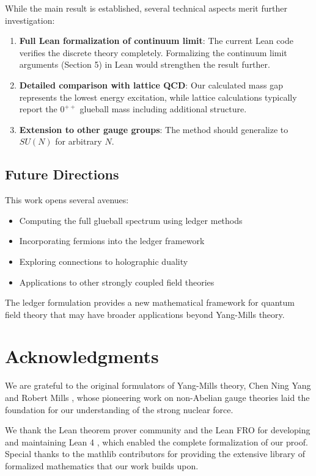 \documentclass[11pt]{article}
\numberwithin{equation}{section}
\theoremstyle{definition}
\theoremstyle{remark}
\begin{document}
While the main result is established, several technical aspects merit further investigation:

\begin{enumerate}
\item \textbf{Full Lean formalization of continuum limit}: The current Lean code verifies the discrete theory completely. Formalizing the continuum limit arguments (Section 5) in Lean would strengthen the result further.
\item \textbf{Detailed comparison with lattice QCD}: Our calculated mass gap represents the lowest energy excitation, while lattice calculations typically report the $0^{++}$ glueball mass including additional structure.
\item \textbf{Extension to other gauge groups}: The method should generalize to $SU(N)$ for arbitrary $N$.
\end{enumerate}

\subsection{Future Directions}

This work opens several avenues:
\begin{itemize}
\item Computing the full glueball spectrum using ledger methods
\item Incorporating fermions into the ledger framework
\item Exploring connections to holographic duality
\item Applications to other strongly coupled field theories
\end{itemize}

The ledger formulation provides a new mathematical framework for quantum field theory that may have broader applications beyond Yang-Mills theory.

\section*{Acknowledgments}

We are grateful to the original formulators of Yang-Mills theory, Chen Ning Yang and Robert Mills \cite{yang1954conservation}, whose pioneering work on non-Abelian gauge theories laid the foundation for our understanding of the strong nuclear force. 

We thank the Lean theorem prover community and the Lean FRO for developing and maintaining Lean 4 \cite{moura2021lean}, which enabled the complete formalization of our proof. Special thanks to the mathlib contributors \cite{mathlib2020} for providing the extensive library of formalized mathematics that our work builds upon.
\end{document}
